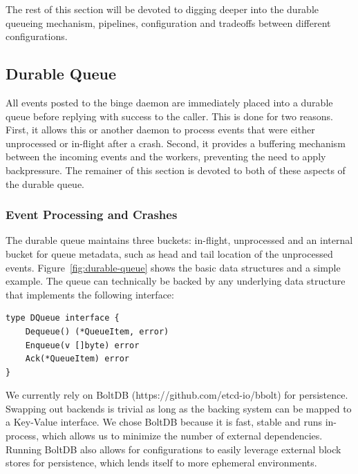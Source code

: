 \documentclass[10pt,twocolumn]{article}
\begin{document}
The rest of this section will be devoted to digging deeper into the durable
queueing mechanism, pipelines, configuration and tradeoffs between different
configurations.

\subsection{Durable Queue}

All events posted to the binge daemon are immediately placed into a durable
queue before replying with success to the caller.  This is done for two
reasons.  First, it allows this or another daemon to process events that were
either unprocessed or in-flight after a crash.  Second, it provides a buffering
mechanism between the incoming events and the workers, preventing the need to
apply backpressure.  The remainer of this section is devoted to both of these
aspects of the durable queue.

\subsubsection{Event Processing and Crashes}

The durable queue maintains three buckets: in-flight, unprocessed and an
internal bucket for queue metadata, such as head and tail location of the
unprocessed events.  Figure~\ref{fig:durable-queue} shows the basic data
structures and a simple example.  The queue can technically be backed by any
underlying data structure that implements the following interface:

\begin{lstlisting}[linewidth=\columnwidth,breaklines=true]
type DQueue interface {
    Dequeue() (*QueueItem, error)
    Enqueue(v []byte) error
    Ack(*QueueItem) error
}
\end{lstlisting}

We currently rely on BoltDB (https://github.com/etcd-io/bbolt) for persistence.
Swapping out backends is trivial as long as the backing system can be mapped to
a Key-Value interface.  We chose BoltDB because it is fast, stable and runs
in-process, which allows us to minimize the number of external dependencies.
Running BoltDB also allows for configurations to easily leverage external block
stores for persistence, which lends itself to more ephemeral environments.
\end{document}

